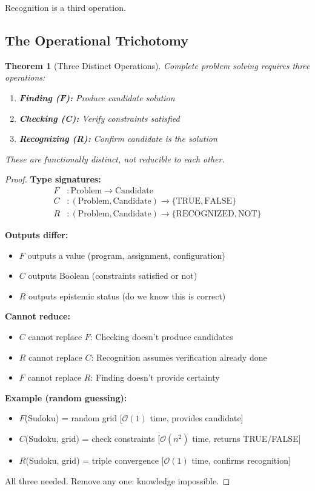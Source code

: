 \documentclass[twocolumn,10pt]{article}
\newtheorem{theorem}{Theorem}[section]
\theoremstyle{definition}
\theoremstyle{remark}
\newcommand{\bigO}{\mathcal{O}}
\begin{document}
Recognition is a third operation.

\subsection{The Operational Trichotomy}

\begin{theorem}[Three Distinct Operations]
\label{thm:operational_trichotomy}
Complete problem solving requires three operations:
\begin{enumerate}
\item \textbf{Finding (F):} Produce candidate solution
\item \textbf{Checking (C):} Verify constraints satisfied
\item \textbf{Recognizing (R):} Confirm candidate is the solution
\end{enumerate}
These are functionally distinct, not reducible to each other.
\end{theorem}

\begin{proof}
\textbf{Type signatures:}
\begin{align}
F &: \text{Problem} \to \text{Candidate} \\
C &: (\text{Problem}, \text{Candidate}) \to \{\text{TRUE}, \text{FALSE}\} \\
R &: (\text{Problem}, \text{Candidate}) \to \{\text{RECOGNIZED}, \text{NOT}\}
\end{align}

\textbf{Outputs differ:}
\begin{itemize}
\item $F$ outputs a value (program, assignment, configuration)
\item $C$ outputs Boolean (constraints satisfied or not)
\item $R$ outputs epistemic status (do we know this is correct)
\end{itemize}

\textbf{Cannot reduce:}
\begin{itemize}
\item $C$ cannot replace $F$: Checking doesn't produce candidates
\item $R$ cannot replace $C$: Recognition assumes verification already done
\item $F$ cannot replace $R$: Finding doesn't provide certainty
\end{itemize}

\textbf{Example (random guessing):}
\begin{itemize}
\item $F$(Sudoku) = random grid [$\bigO(1)$ time, provides candidate]
\item $C$(Sudoku, grid) = check constraints [$\bigO(n^2)$ time, returns TRUE/FALSE]
\item $R$(Sudoku, grid) = triple convergence [$\bigO(1)$ time, confirms recognition]
\end{itemize}

All three needed. Remove any one: knowledge impossible.
\end{proof}
\end{document}
